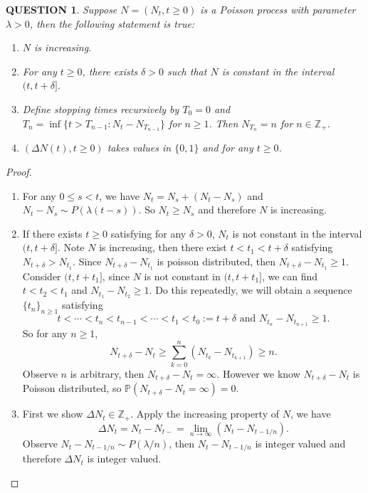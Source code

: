\documentclass[12pt]{article}
\renewcommand{\(}{\left(}%
\renewcommand{\)}{\right)}%
\renewcommand{\[}{\left[}%
\renewcommand{\]}{\right]}%
\newcommand{\z}{\mathbb{Z}}
\newcommand{\p}{\mathbb{P}}
\newtheorem{question}{QUESTION}[section]}
\newtheorem{proof}{Proof.}}
\begin{document}
  \begin{question}
  	Suppose $N=(N_t,t\geq 0)$ is a Poisson process with parameter $\lambda>0$, then the following statement is true:
  	\begin{enumerate}
  		\item $N$ is increasing.
  		\item For any $t\geq 0$, there exists $\delta>0$ such that $N$ is constant in the interval $(t,t+\delta]$.
  		\item Define stopping times recursively by $T_0=0$ and $T_n=\inf\{t>T_{n-1}:N_t-N_{T_{n-1}}\}$ for $n\geq 1$. Then $N_{T_n}=n$ for $n\in\z_+$.
  		\item $(\Delta N(t),t\geq 0)$ takes values in $\{0,1\}$ and for any $t\geq 0$.
  	\end{enumerate}
  \end{question}
  \begin{proof}
  	\begin{enumerate}
  		\item For any $0\leq s<t$, we have $N_t=N_s+(N_t-N_s)$ and $N_t-N_s\sim P(\lambda(t-s))$. So $N_t\geq N_s$ and therefore $N$ is increasing.
  		\item If there exists $t\geq 0$ satisfying for any $\delta>0$, $N_t$ is not constant in the interval $(t,t+\delta]$. Note $N$ is increasing, then there exist $t<t_1< t+\delta$ satisfying $N_{t+\delta}> N_{t_1}$. Since $N_{t+\delta}- N_{t_1}$ is poisson distributed, then $N_{t+\delta}- N_{t_1}\geq 1$. Consider $(t,t+t_1]$, since $N$ is not constant in $(t,t+t_1]$, we can find $t<t_2<t_1$ and $N_{t_1}-N_{t_2}\geq 1$. Do this repeatedly, we will obtain a sequence $\{t_n\}_{n\geq 1}$ satisfying
  		\begin{equation*}
  			t<\cdots<t_n<t_{n-1}<\cdots<t_1<t_0:=t+\delta\text{ and } N_{t_n}-N_{t_{n+1}}\geq 1.
  		\end{equation*}
  		So for any $n\geq 1$, 
  		\begin{equation*}
  			N_{t+\delta}-N_t\geq \sum_{k=0}^n(N_{t_k}-N_{t_{k+1}})\geq n.
  		\end{equation*}
  		Observe $n$ is arbitrary, then $N_{t+\delta}-N_t=\infty$. However we know $N_{t+\delta}-N_t$ is Poisson distributed, so $\p(N_{t+\delta}-N_t=\infty)=0$.
  		\item First we show $\Delta N_t\in\z_+$. Apply the increasing property of $N$, we have
  	\begin{equation*}
  		\Delta N_t=N_t-N_{t-}=\lim_{n\to\infty}(N_t-N_{t-1/n}).
  	\end{equation*}
  	Observe $N_t-N_{t-1/n}\sim P(\lambda/n)$, then $N_t-N_{t-1/n}$ is integer valued and therefore $\Delta N_t$ is integer valued. 
  	\end{enumerate}
  \end{proof}
  
\end{document}
